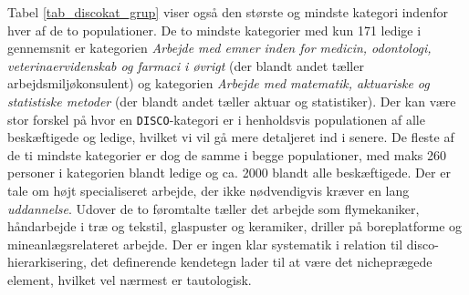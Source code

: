 Tabel \ref{tab_discokat_grup} viser også den største og mindste kategori indenfor hver af de to populationer. De to mindste kategorier med kun 171 ledige i gennemsnit er kategorien \emph{Arbejde med emner inden for medicin, odontologi, veterinaervidenskab og farmaci i øvrigt
} (der blandt andet tæller arbejdsmiljøkonsulent) og kategorien \emph{Arbejde med matematik, aktuariske og statistiske metoder} (der blandt andet tæller aktuar og statistiker). Der kan være stor forskel på hvor en \texttt{DISCO}-kategori er i henholdsvis populationen af alle beskæftigede og ledige, hvilket vi vil gå mere detaljeret ind i senere. De fleste af de ti mindste kategorier er dog de samme i begge populationer, med maks 260 personer i kategorien blandt ledige og ca. 2000 blandt alle  beskæftigede. Der er tale om højt specialiseret arbejde, der ikke nødvendigvis kræver en lang \emph{uddannelse}. Udover de to føromtalte tæller det arbejde som flymekaniker, håndarbejde i træ og tekstil, glaspuster og keramiker, driller på boreplatforme og mineanlægsrelateret arbejde. Der er ingen klar systematik i relation til disco-hierarkisering, det definerende kendetegn lader til at være det nicheprægede element, hvilket vel nærmest er tautologisk.

